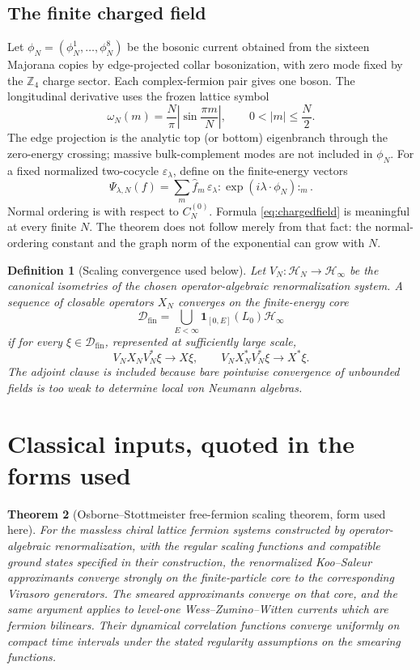\documentclass[11pt]{article}
\newtheorem{theorem}{Theorem}[section]
\newtheorem{definition}[theorem]{Definition}
\theoremstyle{remark}
\newcommand{\Hh}{\mathcal H}
\newcommand{\Z}{\mathbb Z}
\newcommand{\id}{\mathbf 1}
\newcommand{\Dfin}{\mathcal D_{\mathrm{fin}}}
\begin{document}
\subsection{The finite charged field}

Let $\phi_N=(\phi_N^1,\ldots,\phi_N^8)$ be the bosonic current obtained
from the sixteen Majorana copies by edge-projected collar bosonization,
with zero mode fixed by the $\Z_4$ charge sector.  Each complex-fermion
pair gives one boson.  The longitudinal derivative uses the frozen
lattice symbol
\[
 \omega_N(m)=\frac{N}{\pi}\left|\sin\frac{\pi m}{N}\right|,
 \qquad 0<|m|\le\frac N2.
\tag{2.9}\label{eq:latticesymbol}
\]
The edge projection is the analytic top (or bottom) eigenbranch through
the zero-energy crossing; massive bulk-complement modes are not included
in $\phi_N$.  For a fixed normalized
two-cocycle $\varepsilon_\lambda$, define on the finite-energy vectors
\[
 \Psi_{\lambda,N}(f)
 =\sum_{m}\widehat f_m\,
   \varepsilon_\lambda
   :\!\exp(i\lambda\cdot\phi_N)\!:_m .
 \tag{2.10}\label{eq:chargedfield}
\]
Normal ordering is with respect to $C_N^{(0)}$.  Formula
\eqref{eq:chargedfield} is meaningful at every finite $N$.  The theorem
does not follow merely from that fact: the normal-ordering constant and
the graph norm of the exponential can grow with $N$.

\begin{definition}[Scaling convergence used below]
Let $V_N:\Hh_N\to\Hh_\infty$ be the canonical isometries of the chosen
operator-algebraic renormalization system.  A sequence of closable
operators $X_N$ converges on the finite-energy core
\[
 \Dfin=\bigcup_{E<\infty}\id_{[0,E]}(L_0)\Hh_\infty
 \tag{2.11}\label{eq:core}
\]
if for every $\xi\in\Dfin$, represented at sufficiently large scale,
\[
 V_NX_NV_N^*\xi\longrightarrow X\xi,\qquad
 V_NX_N^*V_N^*\xi\longrightarrow X^*\xi.
 \tag{2.12}\label{eq:graphconv}
\]
The adjoint clause is included because bare pointwise convergence of
unbounded fields is too weak to determine local von Neumann algebras.
\end{definition}

\section{Classical inputs, quoted in the forms used}
\label{sec:classical}

\begin{theorem}[Osborne--Stottmeister free-fermion scaling theorem,
form used here]\label{thm:OS}
For the massless chiral lattice fermion systems constructed by
operator-algebraic renormalization, with the regular scaling functions
and compatible ground states specified in their construction, the
renormalized Koo--Saleur approximants converge strongly on the
finite-particle core to the corresponding Virasoro generators.
The smeared approximants converge on that core, and the same argument
applies to level-one Wess--Zumino--Witten currents which are fermion
bilinears.  Their dynamical correlation functions converge uniformly on
compact time intervals under the stated regularity assumptions on the
smearing functions.
\end{theorem}
\end{document}
